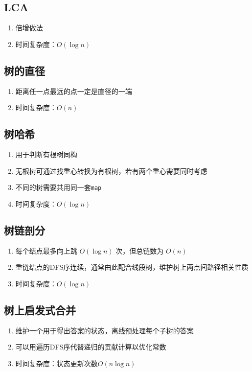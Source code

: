 \documentclass[twocolumn,a4,8pt]{article}  %
\begin{document}
		\subsection{LCA}
			\noindent\begin{enumerate}
				\item 倍增做法
				\item 时间复杂度：$O(\log n)$
				\end{enumerate}
	 	 	
	 	 	
		\subsection{树的直径}
			\noindent\begin{enumerate}
				\item 距离任一点最远的点一定是直径的一端
				\item 时间复杂度：$O(n)$
			\end{enumerate}
	 	 	
	 	 	
		\subsection{树哈希}
			\noindent\begin{enumerate}
				\item 用于判断有根树同构
				\item 无根树可通过找重心转换为有根树，若有两个重心需要同时考虑
				\item 不同的树需要共用同一套\texttt{map}
				\item 时间复杂度：$O(\log n)$
			\end{enumerate}
	 	 	
	 	 	
		\subsection{树链剖分}
			\noindent\begin{enumerate}
				\item 每个结点最多向上跳 $O(\log n)$ 次，但总链数为 $O(n)$
				\item 重链结点的DFS序连续，通常由此配合线段树，维护树上两点间路径相关性质
				\item 时间复杂度：$O(\log n)$
			\end{enumerate}
	 	 	
	 	 	
		\subsection{树上启发式合并}
			\noindent\begin{enumerate}
				\item 维护一个用于得出答案的状态，离线预处理每个子树的答案
				\item 可以用遍历DFS序代替递归的贡献计算以优化常数
				\item 时间复杂度：状态更新次数$O(n\log n)$
			\end{enumerate}
	 	 	
	 	 	
\end{document}
